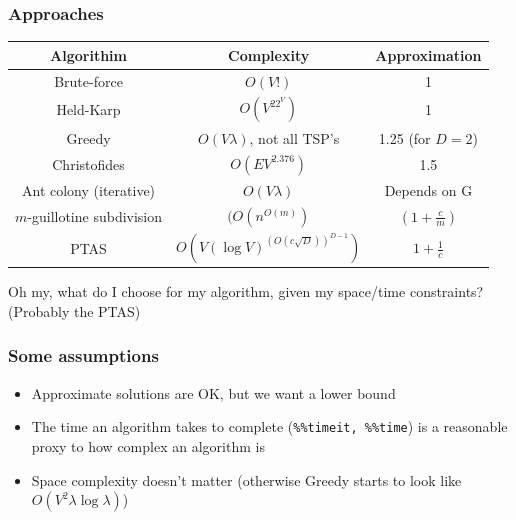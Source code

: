 \documentclass[11pt]{beamer}
\begin{document}
	\begin{frame}
		\frametitle{Approaches}
		\centering
		\footnotesize
		\begin{tabular}{|c|c|c|}
			\hline 
			\textbf{Algorithim} & \textbf{Complexity} & \textbf{Approximation} \\ 
			\hline\hline
			Brute-force & $O(V!)$ & 1 \\ 
			\hline 
			Held-Karp & $O(V^22^V)$ & 1 \\ 
			\hline 
			Greedy & $O(V\lambda)$, not all TSP's & 1.25 (for $D=2$) \\ 
			\hline 
			Christofides & $O(EV^{2.376})$ & 1.5 \\ 
			\hline 
			Ant colony (iterative)& $O(V\lambda)$ & Depends on G  \\ 
			\hline
			$m$-guillotine subdivision & $(O\left(n^{O(m)}\right)$ & $\left(1 + \frac{c}{m}\right)$ \\
			\hline
			PTAS & $O\left(V\left(\log V\right)^{\left(O\left(c\sqrt{D}\right)\right)}^{D-1}\right)$ & $1+\frac{1}{c}$\\
			\hline
		\end{tabular} 
	\normalsize
	Oh my, what do I choose for my algorithm, given my space/time constraints? (Probably the PTAS)
	\end{frame}
	\begin{frame}
		\frametitle{Some assumptions}
		\centering
		\begin{itemize}
			\item Approximate solutions are OK, but we want a lower bound
			\item The time an algorithm takes to complete (\texttt{\%\%timeit, \%\%time}) is a reasonable proxy to how complex an algorithm is
			\item Space complexity doesn't matter (otherwise Greedy starts to look like $O\left(V^2\lambda\log\lambda\right)$)
		\end{itemize}
	\end{frame}
\end{document}
